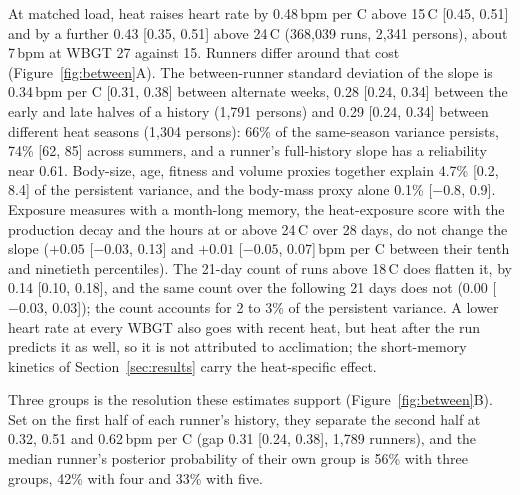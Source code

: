 \documentclass[11pt]{article}
\renewcommand{\_}{\textunderscore\allowbreak}
\begin{document}
At matched load, heat raises heart rate by 0.48\,bpm per \textdegree C above 15\,\textdegree C [0.45, 0.51] and by a further 0.43 [0.35, 0.51] above 24\,\textdegree C (368{,}039 runs, 2{,}341 persons), about 7\,bpm at WBGT 27 against 15. Runners differ around that cost (Figure~\ref{fig:between}A). The between-runner standard deviation of the slope is 0.34\,bpm per \textdegree C [0.31, 0.38] between alternate weeks, 0.28 [0.24, 0.34] between the early and late halves of a history (1{,}791 persons) and 0.29 [0.24, 0.34] between different heat seasons (1{,}304 persons): 66\% of the same-season variance persists, 74\% [62, 85] across summers, and a runner's full-history slope has a reliability near 0.61. Body-size, age, fitness and volume proxies together explain 4.7\% [0.2, 8.4] of the persistent variance, and the body-mass proxy alone 0.1\% [$-0.8$, 0.9]. Exposure measures with a month-long memory, the heat-exposure score with the production decay and the hours at or above 24\,\textdegree C over 28 days, do not change the slope ($+0.05$ [$-0.03$, 0.13] and $+0.01$ [$-0.05$, 0.07]\,bpm per \textdegree C between their tenth and ninetieth percentiles). The 21-day count of runs above 18\,\textdegree C does flatten it, by 0.14 [0.10, 0.18], and the same count over the following 21 days does not (0.00 [$-0.03$, 0.03]); the count accounts for 2 to 3\% of the persistent variance. A lower heart rate at every WBGT also goes with recent heat, but heat after the run predicts it as well, so it is not attributed to acclimation; the short-memory kinetics of Section~\ref{sec:results} carry the heat-specific effect.

Three groups is the resolution these estimates support (Figure~\ref{fig:between}B). Set on the first half of each runner's history, they separate the second half at 0.32, 0.51 and 0.62\,bpm per \textdegree C (gap 0.31 [0.24, 0.38], 1{,}789 runners), and the median runner's posterior probability of their own group is 56\% with three groups, 42\% with four and 33\% with five.
\end{document}
